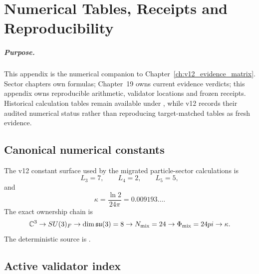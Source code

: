 \chapter{Numerical Tables, Receipts and Reproducibility}
\label{app:v12_numerics_reproducibility}

\paragraph{Purpose.}
This appendix is the numerical companion to Chapter~\ref{ch:v12_evidence_matrix}.
Sector chapters own formulas; Chapter~19 owns current evidence verdicts; this
appendix owns reproducible arithmetic, validator locations and frozen receipts.
Historical calculation tables remain available under
, while v12 records their audited numerical
status rather than reproducing target-matched tables as fresh evidence.

\section{Canonical numerical constants}

The v12 constant surface used by the migrated particle-sector calculations is
\[
L_3=7,\qquad L_4=2,\qquad L_5=5,
\]
and
\[
\boxed{
\kappa=\frac{\ln2}{24\pi}
=0.009193\ldots .
}
\]
The exact ownership chain is
\[
\mathbb C^3
\to SU(3)_F
\to \dim\mathfrak{su}(3)=8
\to N_{\rm mix}=24
\to\Phi_{\rm mix}=24\pi
\to\kappa.
\]
The deterministic source is
.

\section{Active validator index}

